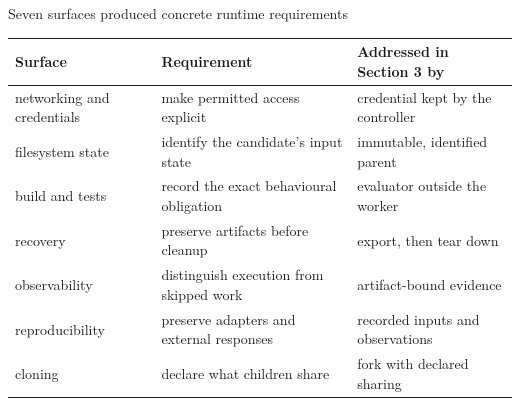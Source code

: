 \begin{frame}[t]{\ev{\tagM\,\tagP}Seven surfaces produced concrete runtime requirements}
\vspace{0pt}
{\small
\begin{tabularx}{\textwidth}{@{}L{3.4cm}L{5.4cm}Y@{}}
\toprule
Surface & Requirement & Addressed in Section 3 by\\
\midrule
networking and credentials & make permitted access explicit & credential kept by the controller\\
filesystem state & identify the candidate's input state & immutable, identified parent\\
build and tests & record the exact behavioural obligation & evaluator outside the worker\\
recovery & preserve artifacts before cleanup & export, then tear down\\
observability & distinguish execution from skipped work & artifact-bound evidence\\
reproducibility & preserve adapters and external responses & recorded inputs and observations\\
cloning & declare what children share & fork with declared sharing\\
\bottomrule
\end{tabularx}\par}
\end{frame}
